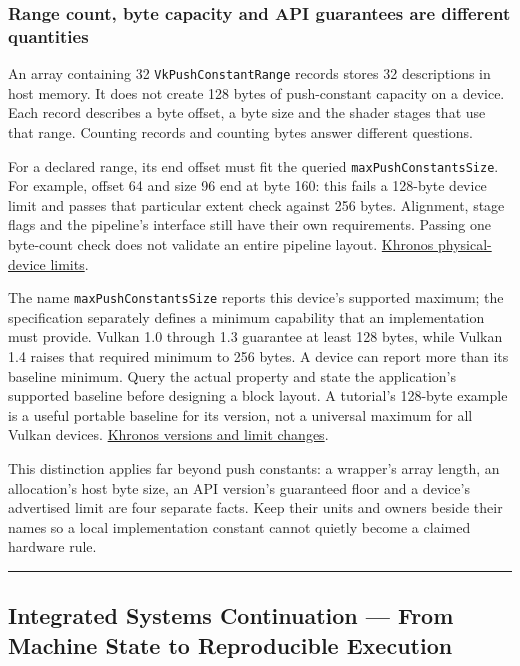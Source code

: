 \subsubsection{Range count, byte capacity and API guarantees are different quantities}\label{range-count-byte-capacity-and-api-guarantees-are-different-quantities}

An array containing 32 \texttt{VkPushConstantRange} records stores 32 descriptions in host memory. It does not create 128 bytes of push-constant capacity on a device. Each record describes a byte offset, a byte size and the shader stages that use that range. Counting records and counting bytes answer different questions.

For a declared range, its end offset must fit the queried \texttt{maxPushConstantsSize}. For example, offset 64 and size 96 end at byte 160: this fails a 128-byte device limit and passes that particular extent check against 256 bytes. Alignment, stage flags and the pipeline's interface still have their own requirements. Passing one byte-count check does not validate an entire pipeline layout. \href{https://docs.vulkan.org/spec/latest/chapters/limits.html}{Khronos physical-device limits}.

The name \texttt{maxPushConstantsSize} reports this device's supported maximum; the specification separately defines a minimum capability that an implementation must provide. Vulkan 1.0 through 1.3 guarantee at least 128 bytes, while Vulkan 1.4 raises that required minimum to 256 bytes. A device can report more than its baseline minimum. Query the actual property and state the application's supported baseline before designing a block layout. A tutorial's 128-byte example is a useful portable baseline for its version, not a universal maximum for all Vulkan devices. \href{https://docs.vulkan.org/guide/latest/versions.html}{Khronos versions and limit changes}.

This distinction applies far beyond push constants: a wrapper's array length, an allocation's host byte size, an API version's guaranteed floor and a device's advertised limit are four separate facts. Keep their units and owners beside their names so a local implementation constant cannot quietly become a claimed hardware rule.

\begin{center}\rule{0.5\linewidth}{0.5pt}\end{center}

\subsection{Integrated Systems Continuation --- From Machine State to Reproducible Execution}\label{integrated-systems-continuation-from-machine-state-to-reproducible-execution}

